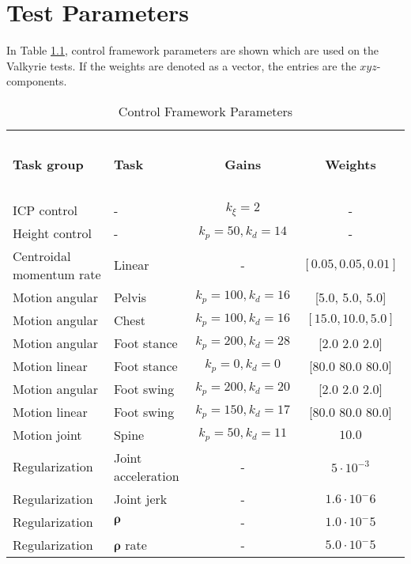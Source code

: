%
\chapter{Test Parameters}\label{chap:params}
In Table \ref{tab:params}, control framework parameters are shown which are used on the Valkyrie tests.  If the weights are denoted as a vector, the entries are the $xyz$-components.

\begin{table}[h]
\caption{Control Framework Parameters}
\label{tab:params}
\begin{center}
\begin{tabular}{llcc}
\hline~\\[-2ex]
\textbf{Task group} & \textbf{Task} & \textbf{Gains} & \textbf{Weights}\\
\hline ~\\[-2ex]
ICP control & - & $k_{\xi}=2$ & - \\
Height control & - & $k_p=50, k_d=14$ & - \\
Centroidal momentum rate & Linear & - & $[0.05, 0.05, 0.01]$ \\
Motion angular & Pelvis & $k_p=100, k_d=16$ & [5.0, 5.0, 5.0]\\
Motion angular & Chest & $k_p=100, k_d=16$ & $[15.0, 10.0, 5.0]$\\
Motion angular & Foot stance & $k_p=200, k_d=28$ &  [2.0 2.0 2.0]\\
Motion linear & Foot stance & $k_p=0, k_d=0$ & [80.0 80.0 80.0]\\
Motion angular & Foot swing & $k_p=200, k_d=20$ & [2.0 2.0 2.0]\\
Motion linear & Foot swing & $k_p=150, k_d=17$ & [80.0 80.0 80.0]\\
Motion joint& Spine & $k_p=50, k_d=11$ & $10.0$\\
Regularization & Joint acceleration & - & $5 \cdot 10^{-3}$\\
Regularization & Joint jerk & - & $1.6 \cdot 10^-{6}$\\
Regularization & $\boldsymbol{\rho}$ & - & $1.0 \cdot 10^-{5}$\\
Regularization & $\boldsymbol{\rho}$ rate & - & $5.0 \cdot 10^-{5}$\\
\hline
\end{tabular}
\end{center}
\end{table}